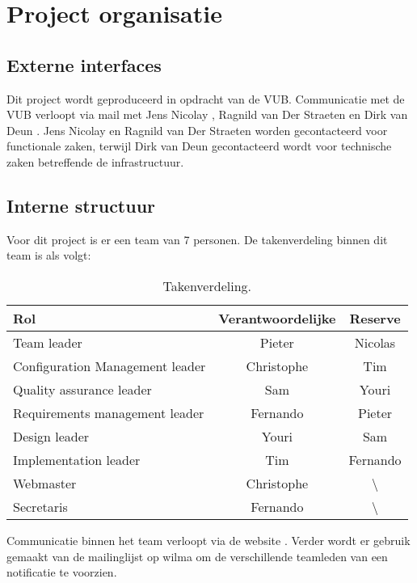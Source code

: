 \chapter{Project organisatie}
\section{Externe interfaces}
Dit project wordt geproduceerd in opdracht van de VUB. Communicatie met de VUB verloopt via mail met Jens Nicolay \cite{JensNicolay}, Ragnild van Der Straeten \cite{RagnhildVanDerStraeten} en Dirk van Deun \cite{DirkVanDeun}. Jens Nicolay en Ragnild van Der Straeten worden gecontacteerd voor functionale zaken, terwijl Dirk van Deun gecontacteerd wordt voor technische zaken betreffende de infrastructuur.
\section{Interne structuur}
Voor dit project is er een team van 7 personen. De takenverdeling binnen dit team is als volgt:
\begin{table} [H]
	\centering
	\caption{Takenverdeling.}
	\begin{tabular} {l|cc}
		Rol & Verantwoordelijke & Reserve \\
		\hline
		Team leader & Pieter & Nicolas \\
		Configuration Management leader & Christophe & Tim \\
		Quality assurance leader & Sam & Youri \\
		Requirements management leader & Fernando & Pieter \\
		Design leader & Youri & Sam \\
		Implementation leader & Tim & Fernando \\
		\hline
		Webmaster & Christophe & \textbackslash \\
		Secretaris & Fernando & \textbackslash 
	\end{tabular}
	\label{tab:takenverdeling}
\end{table}
Communicatie binnen het team verloopt via de website \cite{portalWebsite}. Verder wordt er gebruik gemaakt van de mailinglijst op wilma om de verschillende teamleden van een notificatie te voorzien.